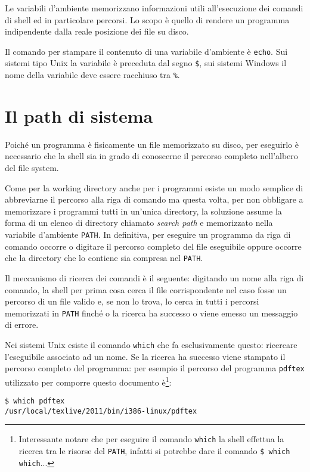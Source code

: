 Le variabili d'ambiente memorizzano informazioni utili all'esecuzione dei comandi di shell ed in particolare percorsi. Lo scopo è quello di rendere un programma indipendente dalla reale posizione dei file su disco.

Il comando per stampare il contenuto di una variabile d'ambiente è \texttt{echo}. Sui sistemi tipo Unix la variabile è preceduta dal segno \texttt{\$}, sui sistemi Windows il nome della variabile deve essere racchiuso tra \texttt{\%}.

\section{Il path di sistema}

Poiché un programma è fisicamente un file memorizzato su disco, per eseguirlo è necessario che la shell sia in grado di conoscerne il percorso completo nell'albero del file system.

Come per la working directory anche per i programmi esiste un modo semplice di abbreviarne il percorso alla riga di comando ma questa volta, per non obbligare a memorizzare i programmi tutti in un'unica directory, la soluzione assume la forma di un elenco di directory chiamato \emph{search path} e memorizzato nella variabile d'ambiente \texttt{PATH}. In definitiva, per eseguire un programma da riga di comando occorre o digitare il percorso completo del file eseguibile oppure occorre che la directory che lo contiene sia compresa nel \texttt{PATH}.

Il meccanismo di ricerca dei comandi è il seguente: digitando un nome alla riga di comando, la shell per prima cosa cerca il file corrispondente nel caso fosse un percorso di un file valido e, se non lo trova, lo cerca in tutti i percorsi memorizzati in \texttt{PATH} finché o la ricerca ha successo o viene emesso un messaggio di errore.

Nei sistemi Unix esiste il comando \texttt{which} che fa esclusivamente questo: ricercare l'eseguibile associato ad un nome. Se la ricerca ha successo viene stampato il percorso completo del programma: per esempio il percorso del programma \texttt{pdftex} utilizzato per comporre questo documento è\footnote{Interessante notare che per eseguire il comando \texttt{which} la shell effettua la ricerca tra le risorse del \texttt{PATH}, infatti si potrebbe dare il comando \texttt{\$ which which}...}:
\begin{verbatim}
$ which pdftex
/usr/local/texlive/2011/bin/i386-linux/pdftex
\end{verbatim}

